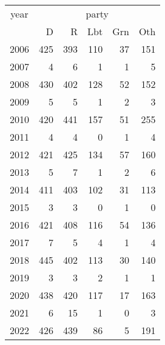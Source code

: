\footnotesize\begin{tabular}[t]{lrrrrr}
\toprule
\multicolumn{1}{c}{year} & \multicolumn{5}{c}{party} \\
\cmidrule(l{3pt}r{3pt}){1-1} \cmidrule(l{3pt}r{3pt}){2-6}
  & D & R & Lbt & Grn & Oth\\
\midrule
2006 & 425 & 393 & 110 & 37 & 151\\
2007 & 4 & 6 & 1 & 1 & 5\\
2008 & 430 & 402 & 128 & 52 & 152\\
2009 & 5 & 5 & 1 & 2 & 3\\
2010 & 420 & 441 & 157 & 51 & 255\\
2011 & 4 & 4 & 0 & 1 & 4\\
2012 & 421 & 425 & 134 & 57 & 160\\
2013 & 5 & 7 & 1 & 2 & 6\\
2014 & 411 & 403 & 102 & 31 & 113\\
2015 & 3 & 3 & 0 & 1 & 0\\
2016 & 421 & 408 & 116 & 54 & 136\\
2017 & 7 & 5 & 4 & 1 & 4\\
2018 & 445 & 402 & 113 & 30 & 140\\
2019 & 3 & 3 & 2 & 1 & 1\\
2020 & 438 & 420 & 117 & 17 & 163\\
2021 & 6 & 15 & 1 & 0 & 3\\
2022 & 426 & 439 & 86 & 5 & 191\\
\bottomrule
\end{tabular}
